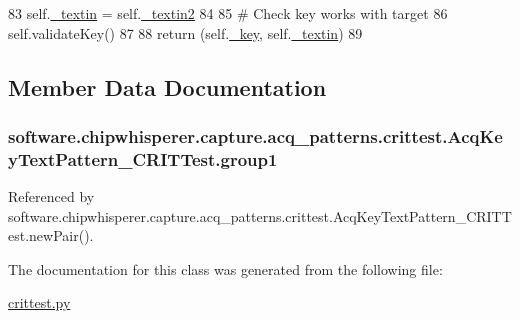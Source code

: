 \begin{DoxyCode}
83             self.\hyperlink{classsoftware_1_1chipwhisperer_1_1capture_1_1acq__patterns_1_1crittest_1_1AcqKeyTextPattern__CRITTest_a19c92c1f093fd65b16a8b05a36d067af}{\_textin} = self.\hyperlink{classsoftware_1_1chipwhisperer_1_1capture_1_1acq__patterns_1_1crittest_1_1AcqKeyTextPattern__CRITTest_ac555a583f3480996a21e9765a917f9cf}{\_textin2}
84 
85         \textcolor{comment}{# Check key works with target}
86         self.validateKey()
87 
88         \textcolor{keywordflow}{return} (self.\hyperlink{classsoftware_1_1chipwhisperer_1_1capture_1_1acq__patterns_1_1crittest_1_1AcqKeyTextPattern__CRITTest_aad6c0ac49254f56f54f4c6c1d8cc332e}{\_key}, self.\hyperlink{classsoftware_1_1chipwhisperer_1_1capture_1_1acq__patterns_1_1crittest_1_1AcqKeyTextPattern__CRITTest_a19c92c1f093fd65b16a8b05a36d067af}{\_textin})
89 \end{DoxyCode}


\subsection{Member Data Documentation}
\hypertarget{classsoftware_1_1chipwhisperer_1_1capture_1_1acq__patterns_1_1crittest_1_1AcqKeyTextPattern__CRITTest_a525ee1e4b14715e6e00e7d26653ea5c9}{}
\subsubsection[{group1}]{\setlength{\rightskip}{0pt plus 5cm}software.\+chipwhisperer.\+capture.\+acq\+\_\+patterns.\+crittest.\+Acq\+Key\+Text\+Pattern\+\_\+\+C\+R\+I\+T\+Test.\+group1}\label{classsoftware_1_1chipwhisperer_1_1capture_1_1acq__patterns_1_1crittest_1_1AcqKeyTextPattern__CRITTest_a525ee1e4b14715e6e00e7d26653ea5c9}


Referenced by software.\+chipwhisperer.\+capture.\+acq\+\_\+patterns.\+crittest.\+Acq\+Key\+Text\+Pattern\+\_\+\+C\+R\+I\+T\+Test.\+new\+Pair().



The documentation for this class was generated from the following file\+:\begin{DoxyCompactItemize}
\item 
\hyperlink{crittest_8py}{crittest.\+py}\end{DoxyCompactItemize}
